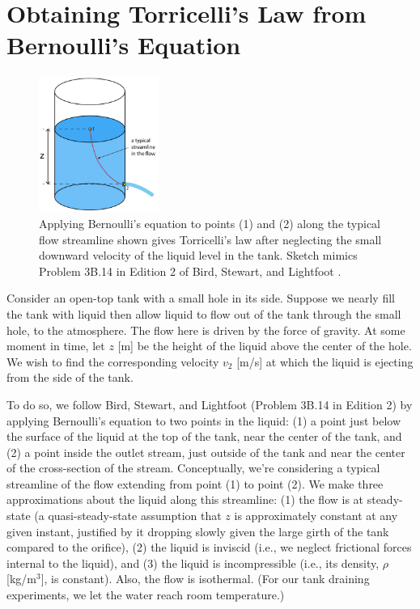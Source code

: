 \documentclass[a4paper,fleqn]{cas-sc}
\begin{document}
\clearpage

\section{Obtaining Torricelli's Law from Bernoulli's Equation}
\label{sec:Torricelli}

\begin{figure}
	\centering
	\includegraphics[width=0.35\textwidth]{../drawings_and_photos/torricelli_illustration.pdf}
	\caption{Applying Bernoulli's equation to points (1) and (2) along the typical flow streamline shown gives Torricelli's law after neglecting the small downward velocity of the liquid level in the tank. Sketch mimics Problem 3B.14 in Edition 2 of Bird, Stewart, and Lightfoot \cite{bsl_book}.}
\end{figure}

	Consider an open-top tank with a small hole in its side. Suppose we nearly fill the tank with liquid then allow liquid to flow out of the tank through the small hole, to the atmosphere. The flow here is driven by the force of gravity.
	At some moment in time, let $z$ [m] be the height of the liquid above the center of the hole. 
	We wish to find the corresponding velocity $v_2$ [m/s] at which the liquid is ejecting from the side of the tank. 
	
	To do so, we follow Bird, Stewart, and Lightfoot \cite{bsl_book} (Problem 3B.14 in Edition 2) by applying Bernoulli's equation to two points in the liquid: 
	(1) a point just below the surface of the liquid at the top of the tank, near the center of the tank, and 
	(2) a point inside the outlet stream, just outside of the tank and near the center of the cross-section of the stream. 
	 Conceptually, we're considering a typical streamline of the flow extending from point (1) to point (2).
	We make three approximations about the liquid along this streamline: 
	(1) the flow is at steady-state (a quasi-steady-state assumption that $z$ is approximately constant at any given instant, justified by it dropping slowly given the large girth of the tank compared to the orifice),
	(2) the liquid is inviscid (i.e., we neglect frictional forces internal to the liquid),
	and
	(3) the liquid is incompressible (i.e., its density, $\rho$ [kg/m$^3$], is constant).
	Also, the flow is isothermal. (For our tank draining experiments, we let the water reach room temperature.)
	
\end{document}
